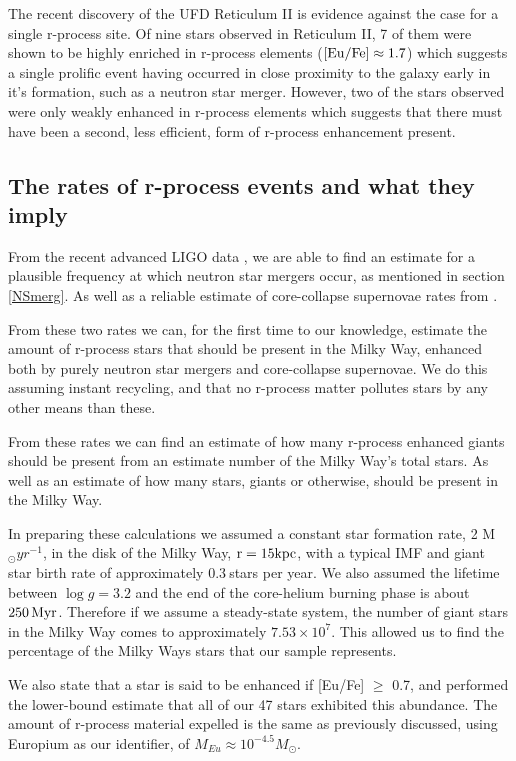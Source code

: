 \documentclass[a4paper,fleqn,usenatbib]{mnras}
\begin{document}
	The recent discovery of the UFD Reticulum II \citep{Ji2016} is evidence against the case for a single r-process site. Of nine stars observed in Reticulum II, 7 of them were shown to be highly enriched in r-process elements ($\rm{[Eu/Fe]\approx1.7}$) which suggests a single prolific event having occurred in close proximity to the galaxy early in it's formation, such as a neutron star merger. However, two of the stars observed were only weakly enhanced in r-process elements which suggests that there must have been a second, less efficient, form of r-process enhancement present.
	
	\subsection{The rates of r-process events and what they imply}
	\label{rates}
	From the recent advanced LIGO data \citep{LIGO2016}, we are able to find an estimate for a plausible frequency at which neutron star mergers occur, as mentioned in section \ref{NSmerg}. As well as a reliable estimate of core-collapse supernovae rates from \citet{Li2011}.
	
	From these two rates we can, for the first time to our knowledge, estimate the amount of r-process stars that should be present in the Milky Way, enhanced both by purely neutron star mergers and core-collapse supernovae. We do this assuming instant recycling, and that no r-process matter pollutes stars by any other means than these.
	
	From these rates we can find an estimate of how many r-process enhanced giants should be present from an estimate number of the Milky Way's total stars. As well as an estimate of how many stars, giants or otherwise, should be present in the Milky Way.
	
	In preparing these calculations we assumed a constant star formation rate, 2 M$_\odot yr^{-1}$, in the disk of the Milky Way, $\rm{r=15kpc}$, with a typical IMF and giant star birth rate of approximately $0.3\ $stars per year. We also assumed the lifetime between $\log{g} = 3.2$ and the end of the core-helium burning phase is about $250\,{\rm Myr}$. Therefore if we assume a steady-state system, the number of giant stars in the Milky Way comes to approximately $7.53\times10^7$. This allowed us to find the percentage of the Milky Ways stars that our sample represents.
	
	We also state that a star is said to be enhanced if [Eu/Fe] $\geq$ 0.7, and performed the lower-bound estimate that all of our 47 stars exhibited this abundance. The amount of r-process material expelled is the same as previously discussed, using Europium as our identifier, of $M_{Eu}\approx10^{-4.5} M_{\odot}$.
	
\end{document}
